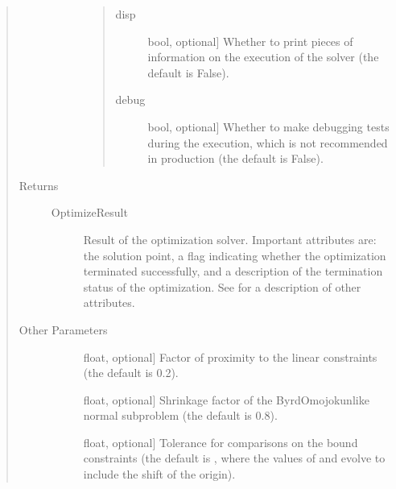 \documentclass[letterpaper,10pt,english]{sphinxmanual}
\begin{document}
\begin{fulllineitems}
\begin{quote}
\begin{description}
\begin{description}
\begin{quote}
\begin{description}
\item[{disp}] \leavevmode{[}bool, optional{]}
\sphinxAtStartPar
Whether to print pieces of information on the execution of the
solver (the default is False).

\item[{debug}] \leavevmode{[}bool, optional{]}
\sphinxAtStartPar
Whether to make debugging tests during the execution, which is
not recommended in production (the default is False).

\end{description}
\end{quote}

\end{description}

\item[{Returns}] \leavevmode\begin{description}
\item[{OptimizeResult}] \leavevmode
\sphinxAtStartPar
Result of the optimization solver. Important attributes are:  the
solution point,  a flag indicating whether the optimization
terminated successfully, and  a description of the
termination status of the optimization. See {\hyperref[\detokenize{refs/generated/cobyqa.OptimizeResult:cobyqa.OptimizeResult}]{}} for a
description of other attributes.

\end{description}

\item[{Other Parameters}] \leavevmode\begin{description}
\item[{}] \leavevmode{[}float, optional{]}
\sphinxAtStartPar
Factor of proximity to the linear constraints (the default is 0.2).

\item[{}] \leavevmode{[}float, optional{]}
\sphinxAtStartPar
Shrinkage factor of the Byrd\sphinxhyphen{}Omojokun\sphinxhyphen{}like normal subproblem (the
default is 0.8).

\item[{}] \leavevmode{[}float, optional{]}
\sphinxAtStartPar
Tolerance for comparisons on the bound constraints (the default is
, where the values
of  and  evolve to include the shift of the origin).


\end{description}
\end{description}
\end{quote}
\end{fulllineitems}
\end{document}
